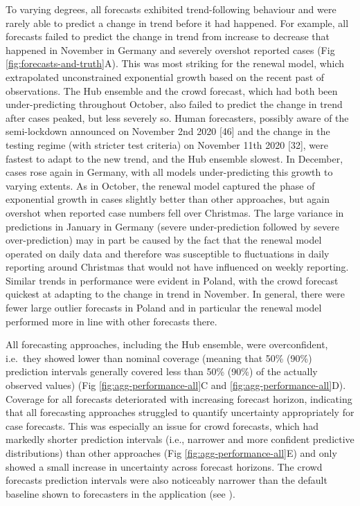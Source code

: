 \documentclass[10pt,letterpaper]{article}
\begin{document}
To varying degrees, all forecasts exhibited trend-following behaviour
and were rarely able to predict a change in trend before it had
happened. For example, all forecasts failed to predict the change in
trend from increase to decrease that happened in November in Germany and
severely overshot reported cases (Fig \ref{fig:forecasts-and-truth}A).
This was most striking for the renewal model, which extrapolated
unconstrained exponential growth based on the recent past of
observations. The Hub ensemble and the crowd forecast, which had both
been under-predicting throughout October, also failed to predict the
change in trend after cases peaked, but less severely so. Human
forecasters, possibly aware of the semi-lockdown announced on November
2nd 2020 {[}46{]} and the change in the testing regime (with stricter
test criteria) on November 11th 2020 {[}32{]}, were fastest to adapt to
the new trend, and the Hub ensemble slowest. In December, cases rose
again in Germany, with all models under-predicting this growth to
varying extents. As in October, the renewal model captured the phase of
exponential growth in cases slightly better than other approaches, but
again overshot when reported case numbers fell over Christmas. The large
variance in predictions in January in Germany (severe under-prediction
followed by severe over-prediction) may in part be caused by the fact
that the renewal model operated on daily data and therefore was
susceptible to fluctuations in daily reporting around Christmas that
would not have influenced on weekly reporting. Similar trends in
performance were evident in Poland, with the crowd forecast quickest at
adapting to the change in trend in November. In general, there were
fewer large outlier forecasts in Poland and in particular the renewal
model performed more in line with other forecasts there.

All forecasting approaches, including the Hub ensemble, were
overconfident, i.e.~they showed lower than nominal coverage (meaning
that 50\% (90\%) prediction intervals generally covered less than 50\%
(90\%) of the actually observed values) (Fig
\ref{fig:agg-performance-all}C and \ref{fig:agg-performance-all}D).
Coverage for all forecasts deteriorated with increasing forecast
horizon, indicating that all forecasting approaches struggled to
quantify uncertainty appropriately for case forecasts. This was
especially an issue for crowd forecasts, which had markedly shorter
prediction intervals (i.e., narrower and more confident predictive
distributions) than other approaches (Fig
\ref{fig:agg-performance-all}E) and only showed a small increase in
uncertainty across forecast horizons. The crowd forecasts prediction
intervals were also noticeably narrower than the default baseline shown
to forecasters in the application (see
).
\end{document}
